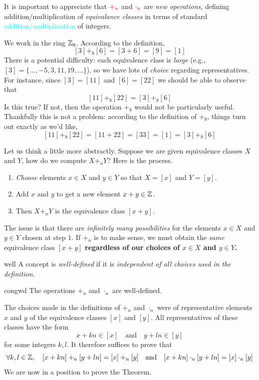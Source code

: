 It is important to appreciate that $\textcolor{red}{+_n}$ and $\textcolor{red}{\cdot_n}$ are \emph{new operations,} defining addition/multiplication of \emph{equivalance classes} in terms of standard \textcolor{cyan}{addition/multiplication} of integers.

\begin{example}{}{}
	We work in the ring $\mathbb{Z}_8$. According to the definition,
	\[
		[3]+_8[6]=[3+6]=[9]=[1]
	\]
	There is a potential difficulty: each equivalence class is \emph{large} (e.g., $[3]=\{\ldots,-5,3,11,19,\ldots\}$), so we have lots of \emph{choice} regarding representatives. For instance, since $[3]=[11]$ and $[6]=[22]$ we should be able to observe that
	\[
		[11]+_8[22] =[3]+_8[6]
	\]
	Is this true? If not, then the operation $+_8$ would not be particularly useful. Thankfully this is not a problem: according to the definition of $+_8$, things turn out exactly as we'd like,
	\[
		[11]+_8[22]=[11+22]=[33]=[1] =[3]+_8[6]
	\]
\end{example}


\goodbreak


Let us think a little more abstractly. Suppose we are given equivalence classes $X$ and $Y$, how do we compute $X+_nY$? Here is the process.
\begin{enumerate}
  \item \emph{Choose} elements $x\in X$ and $y\in Y$ so that $X=[x]$ and $Y=[y]$.
  \item Add $x$ and $y$ to get a new element $x+y\in\mathbb{Z}$.
  \item Then $X+_nY$ is the equivalence class $[x+y]$.
\end{enumerate}
The issue is that there are \emph{infinitely many possibilities} for the elements $x\in X$ and $y\in Y$ chosen at step 1. If $+_n$ is to make sense, we must obtain the \emph{same} equivalence class $[x+y]$ {\bf regardless of our choices of $x\in X$ and $y\in Y$.}

\begin{defn}{}{well}
	A concept is \emph{well-defined} if it is \emph{independent of all choices used in the definition.}
\end{defn}

\begin{thm}{}{congwd}
	The operations $+_n$ and $\cdot_n$ are well-defined.
\end{thm}

The choices made in the definitions of $+_n$ and $\cdot_n$ were of representative elements $x$ and $y$ of the equivalence classes $[x]$ and $[y]$. All representatives of these classes have the form
\[
	x+kn\in[x]\quad\text{and}\quad y+ln\in[y]
\]
for some integers $k,l$. It therefore suffices to prove that
\[
	\forall k,l\in\mathbb{Z},\quad [x+kn]+_n[y+ln]=[x]+_n[y]\quad\text{and}\quad [x+kn]\cdot_n[y+ln]=[x]\cdot_n[y]
\]
We are now in a position to prove the Theorem.


